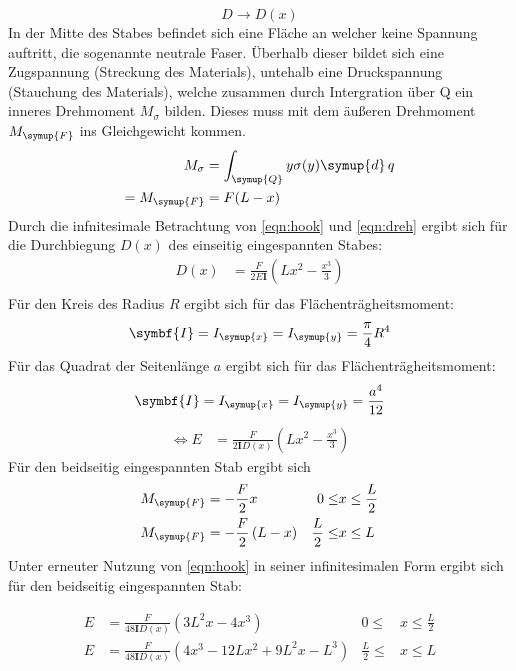 \begin{equation}
  D \to D(x)
\end{equation}
In der Mitte des Stabes befindet sich eine Fläche an welcher
keine Spannung auftritt, die sogenannte neutrale Faser. Überhalb dieser
bildet sich eine Zugspannung (Streckung des Materials), untehalb eine Druckspannung
(Stauchung des Materials), welche zusammen durch Intergration über Q ein inneres Drehmoment $M_\sigma$ bilden.
Dieses muss mit dem äußeren Drehmoment $M_\symup{F}$ ins Gleichgewicht kommen.
\begin{equation}
  \begin{split}
    \label{eqn:dreh}
    M_\sigma &= \int_\symup{Q} y \sigma(y) \symup{d} \, q\\
    =M_\symup{F} &= F(L-x)
  \end{split}
\end{equation}
Durch die infnitesimale Betrachtung von \eqref{eqn:hook} und \eqref{eqn:dreh} ergibt
sich für die Durchbiegung $D(x)$ des einseitig eingespannten Stabes:
\begin{align}
  D(x) &= \frac{F}{2E\symbf{I}}\left(Lx^2-\frac{x^3}{3}\right)\\
\end{align}
Für den Kreis des Radius $R$ ergibt sich für das Flächenträgheitsmoment:
\begin{equation}
  \symbf{I}=I_\symup{x}=I_\symup{y}=\frac{\pi}{4}R^4
  \label{eqn:Ikreis}
\end{equation}
Für das Quadrat der Seitenlänge $a$ ergibt sich für das Flächenträgheitsmoment:
\begin{equation}
  \symbf{I}=I_\symup{x}=I_\symup{y}=\frac{a^4}{12}
  \label{eqn:Iquadrat}
\end{equation}
\begin{align}
\iff E &= \frac{F}{2\symbf{I}D(x)}\left(Lx^2-\frac{x^3}{3}\right)
\label{eqn:einseitig}
\end{align}
Für den beidseitig eingespannten Stab ergibt sich
\begin{align}
  M_\symup{F} &= -\frac{F}{2}x & 0 \leq &x \leq \frac{L}{2}\\
  M_\symup{F} &= -\frac{F}{2}\left(L-x\right) & \frac{L}{2} \leq &x \leq L\\
\end{align}
Unter erneuter Nutzung von \eqref{eqn:hook} in seiner infinitesimalen Form
ergibt sich für den beidseitig eingespannten Stab:

\begin{align}
  E &= \frac{F}{48\symbf{I}D(x)}\left(3L^2x-4x^3\right)& 0 \leq &x \leq \frac{L}{2}
  \label{eqn:beidseitigl}\\
  E &= \frac{F}{48\symbf{I}D(x)}\left(4x^3-12Lx^2+9L^2x-L^3\right) & \frac{L}{2} \leq &x \leq L
  \label{eqn:beidseitigr}
\end{align}

